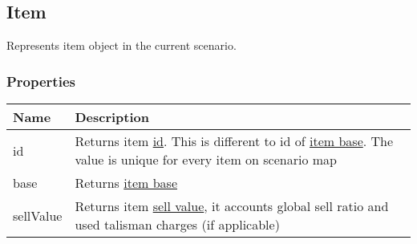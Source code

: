 \subsection{Item}
\label{Item}
Represents item object in the current scenario.
\subsubsection{Properties}
\begin{center}
\begin{tabularx}{\linewidth}{| l | X |}
\hline
\textbf{Name} & \textbf{Description} \\
\hline
id & Returns item \hyperref[Id]{id}. This is different to id of \hyperref[ItemBase]{item base}. The value is unique for every item on scenario map\\
\hline
base & Returns \hyperref[ItemBase]{item base}\\
\hline
sellValue & Returns item \hyperref[Currency]{sell value}, it accounts global sell ratio and used talisman charges (if applicable)\\
\hline
\end{tabularx}
\end{center}